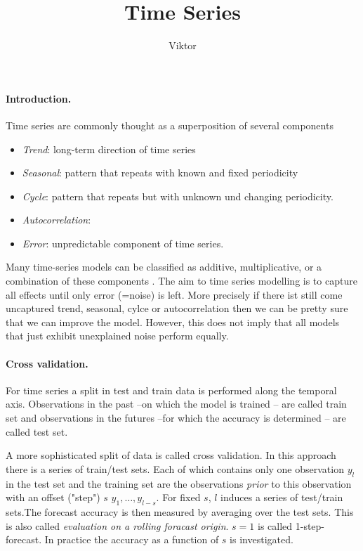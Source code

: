 \documentclass[12pt,a4paper]{article}
\begin{document}

\title{Time Series}
\author{Viktor}
\maketitle
\paragraph{Introduction.}
Time series are commonly thought as a superposition of several components
\begin{itemize}
	\item \textit{Trend}: long-term direction of time series
	\item \textit{Seasonal}: pattern that repeats with known and fixed periodicity 
	\item \textit{Cycle}: pattern that repeats but with unknown und changing periodicity.
	\item \textit{Autocorrelation}:
	\item \textit{Error}: unpredictable component of time series.
\end{itemize}

Many time-series models can be classified as additive, multiplicative, or a combination of these components \cite{hyndman_forecasting_with_exponential_smoothing}. The aim to time series modelling is to capture all effects until only error (=noise) is left. More precisely if there ist still come uncaptured trend, seasonal, cylce or autocorrelation then we can be pretty sure that we can improve the model. However, this does not imply that all models that just exhibit unexplained noise perform equally.  
 
\paragraph{Cross validation.} For time series a split in test and train data is performed along the temporal axis. Observations in the past --on which the model is trained -- are called train set and observations in the futures --for which the accuracy is determined --  are called test set. 

A more sophisticated split of data is called cross validation. In this approach there is a series of train/test sets. Each of which contains only one observation $y_l$ in the test set and the training set  are the observations \textit{prior} to this observation with an offset ("step") $s$ ${y_1, \dots, y_{l-s}}$. For fixed $s$, $l$ induces a series of test/train sets.The forecast accuracy is then measured by averaging over the test sets. This is also called \textit{evaluation on a rolling foracast origin}. $s=1$ is called 1-step-forecast. In practice the accuracy as a function of $s$ is investigated.
\end{document}
